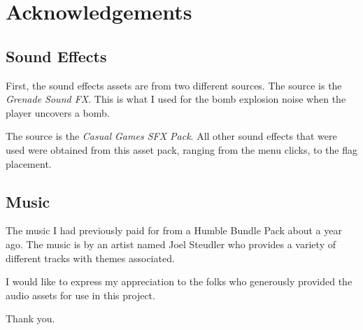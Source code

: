 \section{Acknowledgements}
\label{sec:Acknowledgements}

\subsection{Sound Effects}
\label{subsec:SoundFX}

First, the sound effects assets are from two different sources.
The  source is the \textit{Grenade Sound FX}.
This is what I used for the bomb explosion noise when the player uncovers a bomb.

The  source is the \textit{Casual Games SFX Pack}.
All other sound effects that were used were obtained from this asset pack, ranging from the menu clicks, to the flag placement.

\subsection{Music}
\label{subsec:Music}

The music I had previously paid for from a Humble Bundle Pack about a year ago.
The music is by an artist named Joel Steudler who provides a variety of different tracks with themes associated.

I would like to express my appreciation to the folks who generously provided the audio assets for use in this project.

Thank you.

